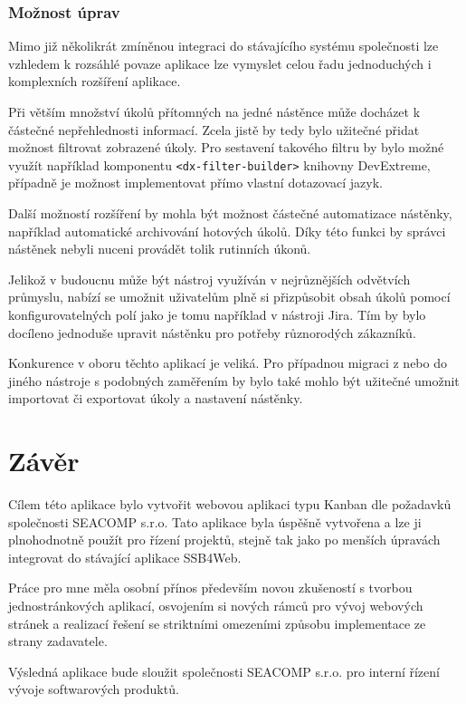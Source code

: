 \subsection{Možnost úprav}
Mimo již několikrát zmíněnou integraci do stávajícího systému společnosti lze vzhledem k rozsáhlé povaze aplikace lze vymyslet celou řadu jednoduchých i komplexních rozšíření aplikace.

Při větším množství úkolů přítomných na jedné nástěnce může docházet k částečné nepřehlednosti informací. Zcela jistě by tedy bylo užitečné přidat možnost filtrovat zobrazené úkoly. Pro sestavení takového filtru by bylo možné využít například komponentu \texttt{<dx-filter-builder>} knihovny DevExtreme, případně je možnost implementovat přímo vlastní dotazovací jazyk.

Další možností rozšíření by mohla být možnost částečné automatizace nástěnky, například automatické archivování hotových úkolů. Díky této funkci by správci nástěnek nebyli nuceni provádět tolik rutinních úkonů. 

Jelikož v budoucnu může být nástroj využíván v nejrůznějších odvětvích průmyslu, nabízí se umožnit uživatelům plně si přizpůsobit obsah úkolů pomocí konfigurovatelných polí jako je tomu například v nástroji Jira. Tím by bylo docíleno jednoduše upravit nástěnku pro potřeby různorodých zákazníků.

Konkurence v oboru těchto aplikací je veliká. Pro případnou migraci z nebo do jiného nástroje s podobných zaměřením by bylo také mohlo být užitečné umožnit importovat či exportovat úkoly a nastavení nástěnky.




\chapter{Závěr}
Cílem této aplikace bylo vytvořit webovou aplikaci typu Kanban dle požadavků společnosti SEACOMP s.r.o. Tato aplikace byla úspěšně vytvořena a lze ji plnohodnotně použít pro řízení projektů, stejně tak jako po menších úpravách integrovat do stávající aplikace SSB4Web.

\blindtext

Práce pro mne měla osobní přínos především novou zkušeností s tvorbou jednostránkových aplikací, osvojením si nových rámců pro vývoj webových stránek a realizací řešení se striktními omezeními způsobu implementace ze strany zadavatele.

Výsledná aplikace bude sloužit společnosti SEACOMP s.r.o. pro interní řízení vývoje softwarových produktů.

